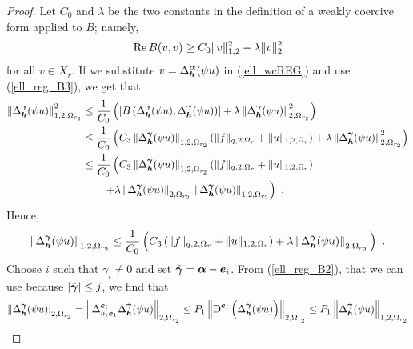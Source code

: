 \begin{proof}
 Let $C_0$ and $\lambda$ be the two constants in the
definition of a weakly coercive form applied to $B$; namely,
\begin{equation} \label{ell_wcREG}
\operatorname{Re} B(v,v) \geq C_0 \|v\|_{1,2}^2 - \lambda \|v\|_2^2
\end{equation}
for all $v \in X_r$.  If we substitute
$\displaystyle v = \Delta^{{\bm{\alpha}}}_{{\bm{h}}} (\psi u)$ in
(\ref{ell_wcREG}) and use (\ref{ell_reg_B3}), we get that
\begin{align*}
\left\| \Delta^{{\bm{\gamma}}}_{{\bm{h}}} (\psi u) \right\|_{1,2,\Omega_{r_2}}^2
&\leq \frac{1}{C_0} \left( \left| B\left(\Delta^{{\bm{\gamma}}}_{{\bm{h}}} (\psi u),
\Delta^{{\bm{\gamma}}}_{{\bm{h}}} (\psi u)\right)\right| + \lambda
\left\|\Delta^{{\bm{\gamma}}}_{{\bm{h}}}
(\psi u)\right\|_{2,\Omega_{r_2}}^2 \right)\\
&\leq \frac{1}{C_0} \left(
C_3 \left\|\Delta^{{\bm{\gamma}}}_{{\bm{h}}} (\psi u)\right\|_{1,2,\Omega_{r_2}}
\left( \|f\|_{q,2,\Omega_r} + \|u\|_{1,2,\Omega_r}\right) + \lambda
\left\|\Delta^{{\bm{\gamma}}}_{{\bm{h}}}
(\psi u)\right\|_{2,\Omega_{r_2}}^2 \right) \\
&\leq \frac{1}{C_0} \left(
C_3 \left\|\Delta^{{\bm{\gamma}}}_{{\bm{h}}} (\psi u)\right\|_{1,2,\Omega_{r_2}}
\left( \|f\|_{q,2,\Omega_r} + \|u\|_{1,2,\Omega_r}\right) \right. \\
&\qquad \left. + \lambda
\left\|\Delta^{{\bm{\gamma}}}_{{\bm{h}}} (\psi u)\right\|_{2,\Omega_{r_2}}\,
\left\|\Delta^{{\bm{\gamma}}}_{{\bm{h}}}
(\psi u)\right\|_{1,2,\Omega_{r_2}} \right) \ .
\end{align*}
Hence,
\[
\left\| \Delta^{{\bm{\gamma}}}_{{\bm{h}}} (\psi u) \right\|_{1,2,\Omega_{r_2}}
\leq \frac{1}{C_0} \left(
C_3 \left( \|f\|_{q,2,\Omega_r} + \|u\|_{1,2,\Omega_r}\right) + \lambda
\left\|\Delta^{{\bm{\gamma}}}_{{\bm{h}}} (\psi u)\right\|_{2,\Omega_{r_2}}\,
\right) \ .
\]
Choose $i$ such that $\gamma_i \neq 0$ and set
$\tilde{{\bm{\gamma}}} = {\bm{\alpha}} - {\bm{e}}_i$.
From (\ref{ell_reg_B2}), that we can use because
$|\tilde{{\bm{\gamma}}}|\leq j$,
we find that
\begin{align*}
\left\| \Delta^{\VEC{\gamma}}_{\VEC{h}} (\psi u) \right|_{2,\Omega_{r_2}}
&= \left\| \Delta_{h_i\VEC{e}_1}^{\VEC{e}_i} \Delta^{\tilde{\VEC{\gamma}}}_{\VEC{h}}
(\psi u) \right\|_{2,\Omega_{r_2}}
\leq P_1 \left\| \diff^{\VEC{e}_i} \left( \Delta^{\tilde{\VEC{\gamma}}}_{\VEC{h}}
(\psi u) \right) \right\|_{2,\Omega_{r_2}}
\leq P_1 \left\| \Delta^{\tilde{\VEC{\gamma}}}_{\VEC{h}}
(\psi u) \right\|_{1,2,\Omega_{r_2}} \\

\end{align*}
\end{proof}

